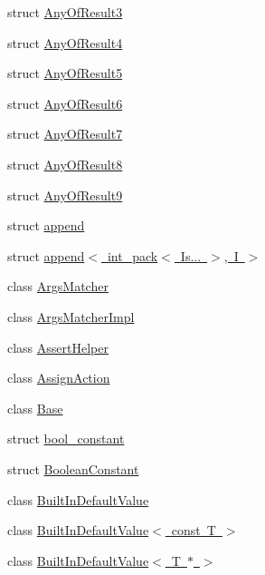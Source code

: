\begin{DoxyCompactItemize}
struct \mbox{\hyperlink{structtesting_1_1internal_1_1_any_of_result3}{Any\+Of\+Result3}}
\item 
struct \mbox{\hyperlink{structtesting_1_1internal_1_1_any_of_result4}{Any\+Of\+Result4}}
\item 
struct \mbox{\hyperlink{structtesting_1_1internal_1_1_any_of_result5}{Any\+Of\+Result5}}
\item 
struct \mbox{\hyperlink{structtesting_1_1internal_1_1_any_of_result6}{Any\+Of\+Result6}}
\item 
struct \mbox{\hyperlink{structtesting_1_1internal_1_1_any_of_result7}{Any\+Of\+Result7}}
\item 
struct \mbox{\hyperlink{structtesting_1_1internal_1_1_any_of_result8}{Any\+Of\+Result8}}
\item 
struct \mbox{\hyperlink{structtesting_1_1internal_1_1_any_of_result9}{Any\+Of\+Result9}}
\item 
struct \mbox{\hyperlink{structtesting_1_1internal_1_1append}{append}}
\item 
struct \mbox{\hyperlink{structtesting_1_1internal_1_1append_3_01int__pack_3_01_is_8_8_8_01_4_00_01_i_01_4}{append$<$ int\+\_\+pack$<$ Is... $>$, I $>$}}
\item 
class \mbox{\hyperlink{classtesting_1_1internal_1_1_args_matcher}{Args\+Matcher}}
\item 
class \mbox{\hyperlink{classtesting_1_1internal_1_1_args_matcher_impl}{Args\+Matcher\+Impl}}
\item 
class \mbox{\hyperlink{classtesting_1_1internal_1_1_assert_helper}{Assert\+Helper}}
\item 
class \mbox{\hyperlink{classtesting_1_1internal_1_1_assign_action}{Assign\+Action}}
\item 
class \mbox{\hyperlink{classtesting_1_1internal_1_1_base}{Base}}
\item 
struct \mbox{\hyperlink{structtesting_1_1internal_1_1bool__constant}{bool\+\_\+constant}}
\item 
struct \mbox{\hyperlink{structtesting_1_1internal_1_1_boolean_constant}{Boolean\+Constant}}
\item 
class \mbox{\hyperlink{classtesting_1_1internal_1_1_built_in_default_value}{Built\+In\+Default\+Value}}
\item 
class \mbox{\hyperlink{classtesting_1_1internal_1_1_built_in_default_value_3_01const_01_t_01_4}{Built\+In\+Default\+Value$<$ const T $>$}}
\item 
class \mbox{\hyperlink{classtesting_1_1internal_1_1_built_in_default_value_3_01_t_01_5_01_4}{Built\+In\+Default\+Value$<$ T $\ast$ $>$}}

\end{DoxyCompactItemize}
